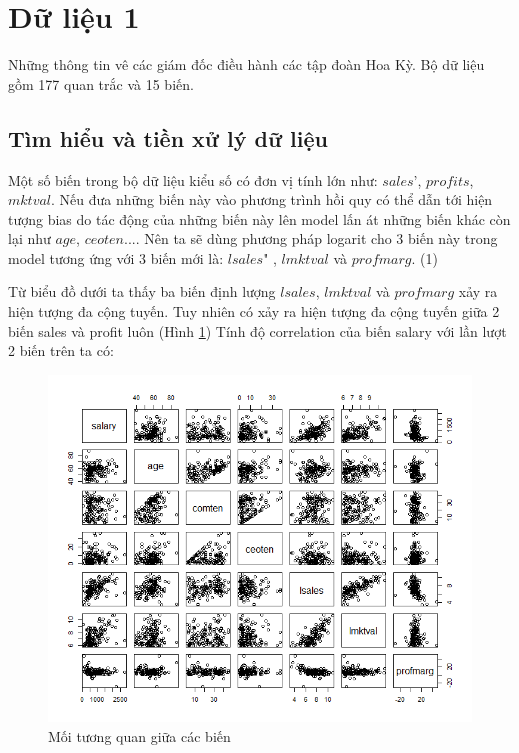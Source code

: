 \section{Dữ liệu 1}
Những thông tin vê các giám đốc điều hành các tập đoàn Hoa Kỳ. Bộ dữ liệu gồm 177 quan trắc và 15 biến.
\subsection*{Tìm hiểu và tiền xử lý dữ liệu}

Một số biến trong bộ dữ liệu kiểu số có đơn vị tính lớn như: $\textit{sales'}$, $\textit{profits}$, $\textit{mktval}$. Nếu đưa những biến này vào phương trình hồi quy có thể dẫn tới hiện tượng bias do tác động của những biến này lên model lấn át những biến khác còn lại như $\textit{age}$, $\textit{ceoten}$.... Nên ta sẽ dùng phương pháp logarit cho 3 biến này trong model tương ứng với 3 biến mới là:  $\textit{lsales"}$ , $\textit{lmktval}$   và $\textit{profmarg}$. (1)


Từ biểu đồ dưới ta thấy ba biến định lượng $\textit{lsales}$, $\textit{lmktval}$ và $\textit{profmarg}$ xảy ra hiện tượng đa cộng tuyến.
Tuy nhiên có xảy ra hiện tượng đa cộng tuyến giữa 2 biến sales và profit luôn (Hình \ref{fig-b1:plot-vars})
Tính độ correlation của biến salary với lần lượt 2 biến trên ta có:

\begin{figure}[!h]
	\centering
	\includegraphics[scale = 0.7]{../Photo Of Result/B1_plotVriables.png}  
	\caption{Mối tương quan giữa các biến}
	\label{fig-b1:plot-vars}
\end{figure}


